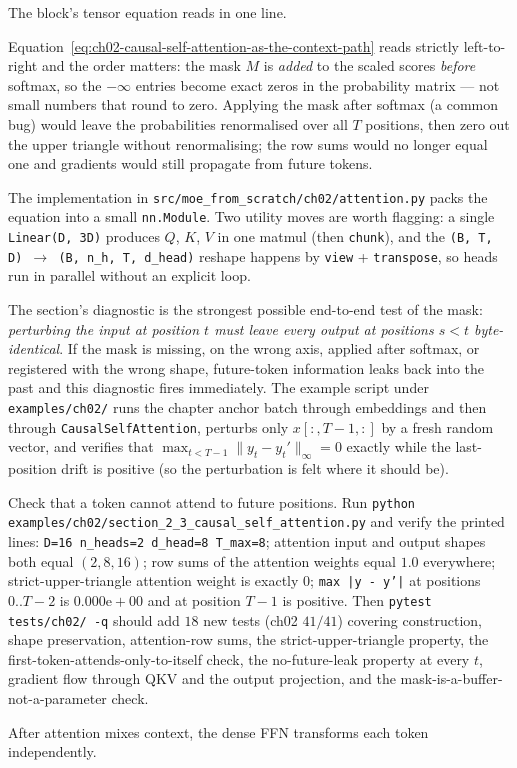 The block's tensor equation reads in one line.



Equation~\ref{eq:ch02-causal-self-attention-as-the-context-path} reads strictly left-to-right and the order matters: the mask $M$ is \emph{added} to the scaled scores \emph{before} softmax, so the $-\infty$ entries become exact zeros in the probability matrix --- not small numbers that round to zero. Applying the mask after softmax (a common bug) would leave the probabilities renormalised over all $T$ positions, then zero out the upper triangle without renormalising; the row sums would no longer equal one and gradients would still propagate from future tokens.

The implementation in \texttt{src/moe\_from\_scratch/ch02/attention.py} packs the equation into a small \texttt{nn.Module}. Two utility moves are worth flagging: a single \texttt{Linear(D, 3D)} produces $Q$, $K$, $V$ in one matmul (then \texttt{chunk}), and the \texttt{(B, T, D) $\to$ (B, n\_h, T, d\_head)} reshape happens by \texttt{view} + \texttt{transpose}, so heads run in parallel without an explicit loop.



The section's diagnostic is the strongest possible end-to-end test of the mask: \emph{perturbing the input at position $t$ must leave every output at positions $s < t$ byte-identical}. If the mask is missing, on the wrong axis, applied after softmax, or registered with the wrong shape, future-token information leaks back into the past and this diagnostic fires immediately. The example script under \texttt{examples/ch02/} runs the chapter anchor batch through embeddings and then through \texttt{CausalSelfAttention}, perturbs only $x[:, T{-}1, :]$ by a fresh random vector, and verifies that $\max_{t < T-1} \lVert y_t - y_t' \rVert_\infty = 0$ exactly while the last-position drift is positive (so the perturbation is felt where it should be).

\begin{checkpointbox}
Check that a token cannot attend to future positions. Run \texttt{python examples/ch02/section\_2\_3\_causal\_self\_attention.py} and verify the printed lines: \texttt{D=16  n\_heads=2  d\_head=8  T\_max=8}; attention input and output shapes both equal $(2, 8, 16)$; row sums of the attention weights equal $1.0$ everywhere; strict-upper-triangle attention weight is exactly $0$; \texttt{max |y - y'|} at positions $0..T{-}2$ is $0.000\mathrm{e}{+}00$ and at position $T{-}1$ is positive. Then \texttt{pytest tests/ch02/ -q} should add $18$ new tests (ch02 $41/41$) covering construction, shape preservation, attention-row sums, the strict-upper-triangle property, the first-token-attends-only-to-itself check, the no-future-leak property at every $t$, gradient flow through QKV and the output projection, and the mask-is-a-buffer-not-a-parameter check.
\end{checkpointbox}

After attention mixes context, the dense FFN transforms each token independently.
